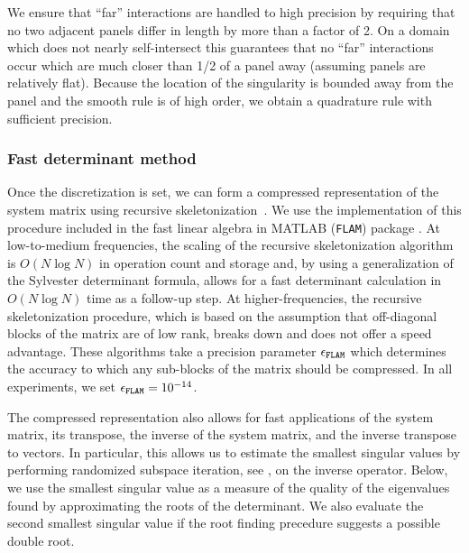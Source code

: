 \begin{remark}
  \label{rmk:levelrestrict}
  We ensure that ``far'' interactions
  are handled to high precision by requiring that
  no two adjacent panels differ in length
  by more than a factor of 2. On a domain which does
  not nearly self-intersect this
  guarantees that no ``far'' interactions occur
  which are much closer than 1/2 of a panel away
  (assuming panels are relatively flat).
  Because the location of the singularity is
  bounded away from the panel and the smooth
  rule is of high order, we obtain a quadrature
  rule with sufficient precision.
\end{remark}

\subsubsection{Fast determinant method}

Once the discretization is set, we can form
a compressed representation of the system matrix
using recursive skeletonization~\cite{ho2012fast}.
%
We use the implementation of this procedure
included in the fast linear algebra in
MATLAB (\texttt{FLAM}) package
\cite{hoFLAM_1253582}.
%
At low-to-medium frequencies, the scaling
of the recursive skeletonization algorithm
is $O(N\log N)$ in operation count and
storage and, by using a generalization
of the Sylvester determinant formula,
allows for a fast determinant
calculation in $O(N\log N)$ time as a
follow-up step.
%
At higher-frequencies,
the recursive skeletonization procedure,
which is based on the assumption that off-diagonal
blocks of the matrix are of low rank,
breaks down and does not offer a speed advantage.
%
These algorithms take a precision parameter
${\epsilon_{\texttt{FLAM}}}$ which determines the
accuracy to which any sub-blocks of the matrix
should be compressed. In all experiments,
we set ${\epsilon_{\texttt{FLAM}}} = 10^{-14}$.

The compressed representation also allows
for fast applications of the system matrix,
its transpose, the inverse of the system
matrix, and the inverse transpose to
vectors.
%
In particular, this allows us to estimate the
smallest singular values by performing
randomized subspace iteration, see
\cite[Algorithm 4.4]{halko2011finding},
on the inverse operator.
%
Below, we use the smallest singular value
as a measure of the quality of the
eigenvalues found by approximating the
roots of the determinant.
%
We also evaluate the second smallest singular
value if the root finding precedure suggests a
possible double root. 


